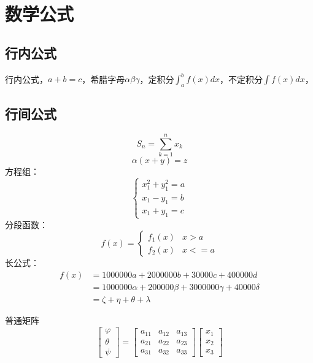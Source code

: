 \documentclass[a4paper,AutoFakeBold={2.7},UTF8,zihao=5,twoside]{ctexart} %
\numberwithin{equation}{section}%
\begin{document}
\clearpage

\section{数学公式}
\subsection{行内公式}
行内公式，$a+b=c$，希腊字母$\alpha\beta\gamma$，定积分$\int_{a}^{b} f(x)dx$，不定积分$\int f(x)dx$，
\subsection{行间公式}
\begin{equation}
	S_{n}=\sum_{k=1}^{n} x_{k} \label{(1)}
\end{equation}
\begin{equation}
	\alpha\left( x+y\right) =z
\end{equation}
方程组：
\begin{equation}
	\begin{cases}
		x_{1}^{2}+y_{1}^2=a\\
		x_{1}-y_{1}=b\\
		x_{1}+y_{1}=c
	\end{cases}
\end{equation}
分段函数：
\begin{equation}
	f(x)=
	\begin{cases}
		f_{1}(x) &x>a\\
		f_{2}(x) &x<=a
	\end{cases}
\end{equation}
长公式：
\begin{equation}
	\begin{split}
		f(x)&=1000000a+2000000b+30000c+400000d\\
		&=1000000\alpha+200000\beta+3000000\gamma+40000\delta\\
		&=\zeta+\eta+\theta+\lambda
	\end{split}
\end{equation}

普通矩阵
\begin{equation}
	\begin{bmatrix}
		\varphi\\
		\theta\\
		\psi
	\end{bmatrix}
	=
	\begin{bmatrix}
		a_{11} & a_{12} & a_{13} \\
		a_{21} & a_{22} & a_{23} \\
		a_{31} & a_{32} & a_{33}
	\end{bmatrix}
	\begin{bmatrix}
		x_{1} \\
		x_{2} \\
		x_{3}
	\end{bmatrix}
\end{equation}
\end{document}
